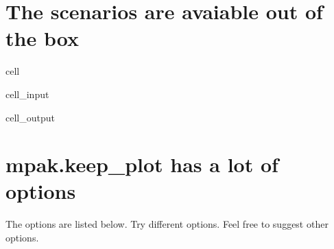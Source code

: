\documentclass[letterpaper,10pt,english]{jupyterBook}
\begin{document}
\section{The scenarios are avaiable out of the box}
\label{\detokenize{content/howto/keep/Create and modify charts with keep_plot:the-scenarios-are-avaiable-out-of-the-box}}
\begin{sphinxuseclass}{cell}\begin{sphinxVerbatimInput}

\begin{sphinxuseclass}{cell_input}
\begin{sphinxVerbatim}[commandchars=\\\{\}]
   
\end{sphinxVerbatim}

\end{sphinxuseclass}\end{sphinxVerbatimInput}
\begin{sphinxVerbatimOutput}

\begin{sphinxuseclass}{cell_output}
\noindent{}

\noindent{}

\end{sphinxuseclass}\end{sphinxVerbatimOutput}

\end{sphinxuseclass}

\section{mpak.keep\_plot has a lot of options}
\label{\detokenize{content/howto/keep/Create and modify charts with keep_plot:mpak-keep-plot-has-a-lot-of-options}}
\sphinxAtStartPar
The options are listed below. Try different options. Feel free to suggest other options.
\end{document}

